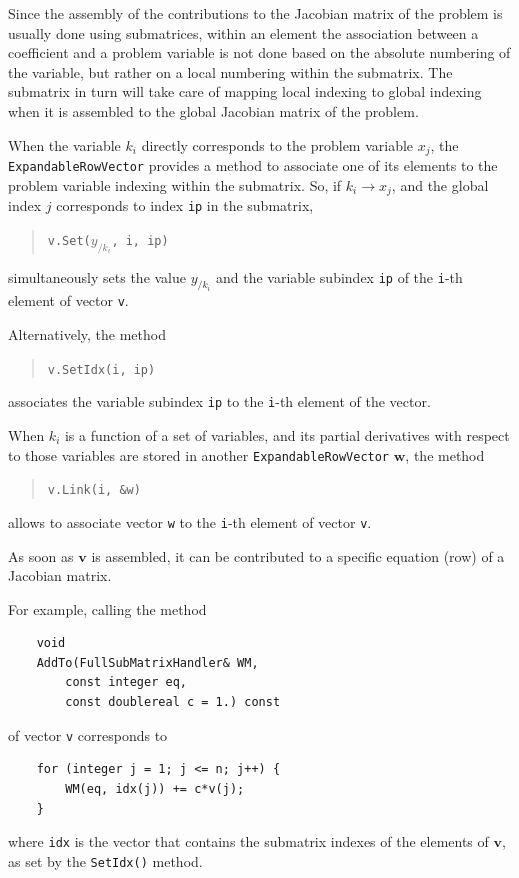 \documentclass[10pt,fleqn,subeqn]{report}
\newcommand{\T}[1]{\bm{#1}}
\begin{document}
Since the assembly of the contributions to the Jacobian matrix of the problem
is usually done using submatrices, within an element the association between
a coefficient and a problem variable is not done based on the absolute numbering
of the variable, but rather on a local numbering within the submatrix.
The submatrix in turn will take care of mapping local indexing to global indexing
when it is assembled to the global Jacobian matrix of the problem.

When the variable $k_i$ directly corresponds to the problem variable $x_j$,
the \texttt{ExpandableRowVector} provides a method to associate
one of its elements to the problem variable indexing within the submatrix.
So, if $k_i\rightarrow x_j$, and the global index $j$ corresponds
to index \texttt{ip} in the submatrix,
\begin{quote}
\texttt{v.Set($y_{/k_i}$, i, ip)}
\end{quote}
simultaneously sets the value $y_{/k_i}$
and the variable subindex \texttt{ip}
of the \texttt{i}-th element of vector \texttt{v}.

Alternatively, the method
\begin{quote}
\texttt{v.SetIdx(i, ip)}
\end{quote}
associates the variable subindex \texttt{ip}
to the \texttt{i}-th element of the vector.

When $k_i$ is a function of a set of variables,
and its partial derivatives with respect to those variables
are stored in another \texttt{ExpandableRowVector} $\T{w}$,
the method
\begin{quote}
\texttt{v.Link(i, \&w)}
\end{quote}
allows to associate vector \texttt{w} to the \texttt{i}-th element
of vector \texttt{v}.

As soon as $\T{v}$ is assembled, it can be contributed
to a specific equation (row) of a Jacobian matrix.

For example, calling the method
\begin{verbatim}
    void
    AddTo(FullSubMatrixHandler& WM,
        const integer eq,
        const doublereal c = 1.) const
\end{verbatim}
of vector \texttt{v} corresponds to
\begin{verbatim}
    for (integer j = 1; j <= n; j++) {
        WM(eq, idx(j)) += c*v(j);
    }
\end{verbatim}
where \texttt{idx} is the vector that contains the submatrix indexes
of the elements of $\T{v}$, as set by the \texttt{SetIdx()} method.
\end{document}
